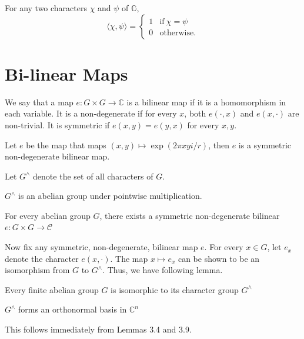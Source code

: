 \begin{lemma}
For any two characters $\chi$ and $\psi$ of $\mathbb{G}$, 
$$ \langle \chi, \psi \rangle =
\begin{cases}
	1             & \text{if} \ \chi = \psi \\
	0             & \text{otherwise}.
\end{cases} $$
\end{lemma}

\section{Bi-linear Maps}
\begin{definition}
We say that a map $e : G \times G  \rightarrow \mathbb{C}$ is a bilinear map if it is a homomorphism in each variable. It is a non-degenerate if for every $x$, both $e(\cdot, x)$ and $e(x, \cdot)$ are non-trivial. It is symmetric if $e(x,y) = e(y,x)$ for every $x, y$.
\end{definition}

\begin{lemma}
Let $e$ be the map that maps $(x,y) \mapsto \exp(2\pi xyi/r)$, then $e$ is a symmetric non-degenerate bilinear map.
\end{lemma}

\noindent Let $G^\land$ denote the set of all characters of $G$. 

\begin{lemma}
$G^\land$ is an abelian group under pointwise multiplication. 
\end{lemma}

\begin{lemma}
For every abelian group $G$, there exists a symmetric non-degenerate bilinear $e : G \times G \rightarrow \mathcal{C}$ 
\end{lemma}

Now fix any symmetric, non-degenerate, bilinear map $e$. For every $x \in G$, let $e_x$ denote the character $e(x,\cdot)$. The map $x \mapsto e_x$ can be shown to be an isomorphism from $G$ to $G^\land$. Thus, we have following lemma.

\begin{lemma}
Every finite abelian group $G$ is isomorphic to its character group $G^\land$
\end{lemma}

\begin{theorem}
$G^\land$ forms an orthonormal basis in $\mathbb{C}^n$
\end{theorem}
This follows immediately from Lemmas 3.4 and 3.9.
